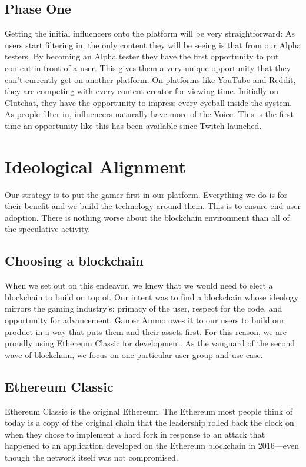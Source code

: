 \documentclass[11pt]{report}
\begin{document}
\subsection{Phase One}
Getting the initial influencers onto the platform will be very straightforward: As users start filtering in, the only content they will be seeing is that from our Alpha testers. By becoming an Alpha tester they have the first opportunity to put content in front of a user. This gives them a very unique opportunity that they can’t currently get on another platform. On platforms like YouTube and Reddit, they are competing with every content creator for viewing time. Initially on Clutchat, they have the opportunity to impress every eyeball inside the system. As people filter in, influencers naturally have more of the Voice. This is the first time an opportunity like this has been available since Twitch launched.
\section{Ideological Alignment}
Our strategy is to put the gamer first in our platform. Everything we do is for their benefit and we build the technology around them. This is to ensure end-user adoption. There is nothing worse about the blockchain environment than all of the speculative activity.
\subsection{Choosing a blockchain}
When we set out on this endeavor, we knew that we would need to elect a blockchain to build on top of. Our intent was to find a blockchain whose ideology mirrors the gaming industry’s: primacy of the user, respect for the code, and opportunity for advancement. Gamer Ammo owes it to our users to build our product in a way that puts them and their assets first. For this reason, we are proudly using Ethereum Classic for development. As the vanguard of the second wave of blockchain, we focus on one particular user group and use case.
\subsection{Ethereum Classic}
Ethereum Classic is the original Ethereum. The Ethereum most people think of today is a copy of the original chain that the leadership rolled back the clock on when they chose to implement a hard fork in response to an attack that happened to an application developed on the Ethereum blockchain in 2016---even though the  network itself was not compromised.
\end{document}
